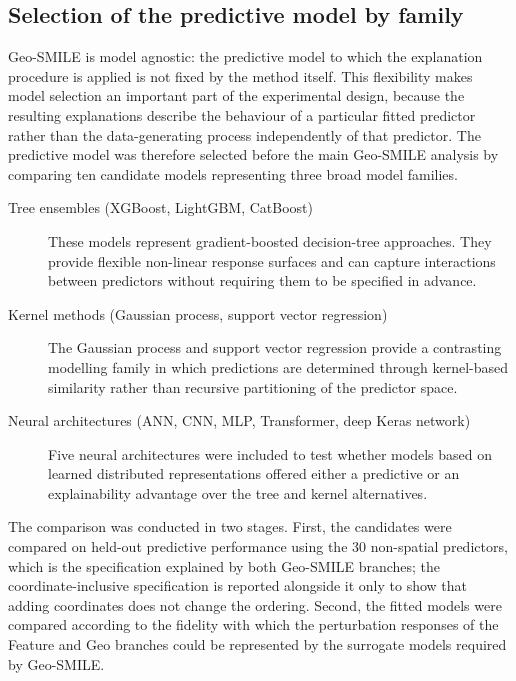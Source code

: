 \subsection{Selection of the predictive model by family}
\label{sec}

Geo-SMILE is model agnostic: the predictive model to which the explanation procedure is applied is not fixed by the method itself. This flexibility makes model selection an important part of the experimental design, because the resulting explanations describe the behaviour of a particular fitted predictor rather than the data-generating process independently of that predictor. The predictive model was therefore selected before the main Geo-SMILE analysis by comparing ten candidate models representing three broad model families.

\begin{description}

\item[Tree ensembles (XGBoost, LightGBM, CatBoost)]
These models represent gradient-boosted decision-tree approaches. They provide flexible non-linear response surfaces and can capture interactions between predictors without requiring them to be specified in advance.

\item[Kernel methods (Gaussian process, support vector regression)]
The Gaussian process and support vector regression provide a contrasting modelling family in which predictions are determined through kernel-based similarity rather than recursive partitioning of the predictor space.

\item[Neural architectures (ANN, CNN, MLP, Transformer, deep Keras network)]
Five neural architectures were included to test whether models based on learned distributed representations offered either a predictive or an explainability advantage over the tree and kernel alternatives.

\end{description}

The comparison was conducted in two stages. First, the candidates were compared on held-out predictive performance using the 30 non-spatial predictors, which is the specification explained by both Geo-SMILE branches; the coordinate-inclusive specification is reported alongside it only to show that adding coordinates does not change the ordering. Second, the fitted models were compared according to the fidelity with which the perturbation responses of the Feature and Geo branches could be represented by the surrogate models required by Geo-SMILE.

